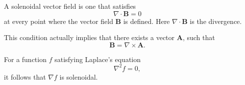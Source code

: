 \documentclass[12pt]{article}
\newcommand{\vA}{\mathbf{A}}
\newcommand{\vB}{\mathbf{B}}
\newcommand{\vnabla}{\nabla}
\begin{document}

A solenoidal vector field is one that satisfies $$\vnabla\cdot\vB = 0$$
at every point where the vector field $\vB$ is defined. Here $\vnabla\cdot\vB$ is the divergence.

This condition actually implies that there exists a vector $\vA$, such that
$$\vB = \vnabla\times\vA.$$

For a function $f$ satisfying Laplace's equation $$\vnabla^2f = 0,$$ it follows that $\vnabla f$ is solenoidal.
\end{document}
